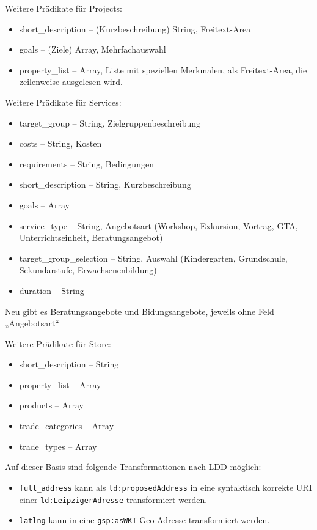 \documentclass[a4paper,11pt]{article}
\begin{document}
Weitere Prädikate für Projects:
\begin{itemize}
  \item short\_description -- (Kurzbeschreibung) String, Freitext-Area
  \item goals -- (Ziele) Array, Mehrfachauswahl
  \item property\_list -- Array, Liste mit speziellen Merkmalen, als
    Freitext-Area, die zeilenweise ausgelesen wird. 
\end{itemize}

Weitere Prädikate für Services:
\begin{itemize}
  \item target\_group -- String, Zielgruppenbeschreibung
  \item costs -- String, Kosten
  \item requirements -- String, Bedingungen
  \item short\_description -- String, Kurzbeschreibung
  \item goals -- Array
  \item service\_type -- String, Angebotsart (Workshop, Exkursion, Vortrag,
    GTA, Unterrichtseinheit, Beratungsangebot)
  \item target\_group\_selection -- String, Auswahl (Kindergarten,
    Grundschule, Sekundarstufe, Erwachsenenbildung)
  \item duration -- String
\end{itemize}
Neu gibt es Beratungsangebote und Bidungsangebote, jeweils ohne Feld
„Angebotsart“ 

Weitere Prädikate für Store:
\begin{itemize}
  \item short\_description -- String
  \item property\_list -- Array
  \item products -- Array
  \item trade\_categories -- Array
  \item trade\_types -- Array
\end{itemize}

Auf dieser Basis sind folgende Transformationen nach LDD möglich:
\begin{itemize}\raggedright
\item \texttt{full\_address} kann als \texttt{ld:proposedAddress} in eine
  syntaktisch korrekte URI einer \texttt{ld:LeipzigerAdresse} transformiert
  werden. 
\item \texttt{latlng} kann in eine \texttt{gsp:asWKT} Geo-Adresse
  transformiert werden.
\end{itemize}
\end{document}
